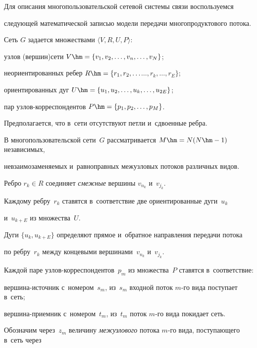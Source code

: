 \vspace*{-2pt}





Для описания многопользовательской сетевой сис\-те\-мы связи  воспользуемся 


сле\-ду\-ющей математической записью модели передачи многопродуктового потока.


Сеть $G$ задается множествами  $\langle V, R,  U, P \rangle$:


узлов (вершин)\linebreak сети  $V \hm= \{ v_1, v_2, \ldots, v_n, \ldots, v_N \}$;


неориентированных ребер $R \hm= \{ r_1, r_2, \ldots$\linebreak $\ldots , r_k, \ldots, r_E \}$;


ориентированных дуг  $U\hm = \{ u_1, u_2, \ldots, u_k, \ldots, u_{2E}\}$;


пар уз\-лов-кор\-рес\-пон\-ден\-тов $P \hm= \{ p_1, p_2, \ldots, p_M\}$.


Предполагается, что в~сети отсутствуют пет\-ли и~сдвоенные реб\-ра.


В многопользовательской сети~$G$ рас\-смат\-ри\-ва\-ет\-ся $M \hm= N (N\hm-1)$ независимых, 


невзаимозаменяемых и~рав\-но\-прав\-ных межузловых потоков различных видов.





Ребро $r_k \in R$ соединяет {\it смежные} вершины $v_{n_k}$ и~$v_{j_k}$.


Каждому реб\-ру~$r_k$ ставятся в~соответствие две ориентированные дуги~$u_k$ 


и~$u_{k+E}$ из множества~$U$.


Дуги $\{u_k, u_{k+E}\}$ определяют прямое и~обрат\-ное на\-прав\-ле\-ния передачи потока 


по  реб\-ру~$r_k$ между концевыми вершинами~$v_{n_k}$ и~$v_{j_k}$.





Каждой паре узлов-корреспондентов~$p_m$ из множества~$P$ ставятся в~соответствие:


вер\-ши\-на-ис\-точ\-ник с~номером~$s_m$,  из~$s_m$  входной поток $m$-го вида поступает в~сеть;


вер\-ши\-на-при\-ем\-ник с~номером~${t_m}$, из~${t_m}$ поток $m$-го вида покидает сеть.


Обозначим через~$z_m$ величину \textit{ межузлового} потока $m$-го вида, по\-сту\-па\-юще\-го в~сеть через 


